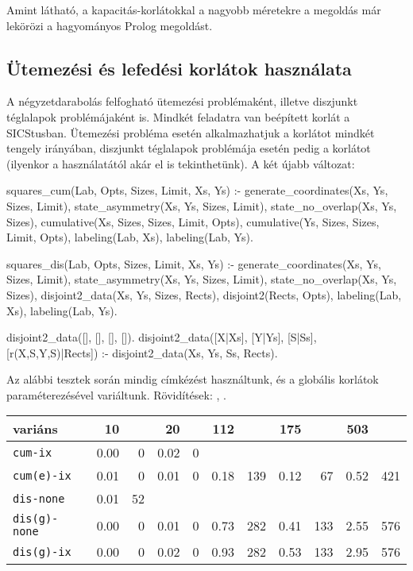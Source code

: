 Amint látható, a kapacitás-korlátokkal a nagyobb méretekre a \clpfd megoldás már
lekörözi a hagyományos Prolog megoldást.

\subsection{Ütemezési és lefedési korlátok használata}

A négyzetdarabolás felfogható ütemezési problémaként, illetve diszjunkt téglalapok
problémájaként is. Mindkét feladatra van beépített korlát a SICStusban. Ütemezési
probléma esetén alkalmazhatjuk a  korlátot mindkét tengely irányában,
diszjunkt téglalapok problémája esetén pedig a  korlátot (ilyenkor a
 használatától akár el is tekinthetünk).
\br
A két újabb változat:

\begin{prologcode}
squares_cum(Lab, Opts, Sizes, Limit, Xs, Ys) :-
        generate_coordinates(Xs, Ys, Sizes, Limit),
        state_asymmetry(Xs, Ys, Sizes, Limit),
        state_no_overlap(Xs, Ys, Sizes),
        cumulative(Xs, Sizes, Sizes, Limit, Opts),
        cumulative(Ys, Sizes, Sizes, Limit, Opts),
        labeling(Lab, Xs), labeling(Lab, Ys).

squares_dis(Lab, Opts, Sizes, Limit, Xs, Ys) :-
        generate_coordinates(Xs, Ys, Sizes, Limit),
        state_asymmetry(Xs, Ys, Sizes, Limit),
        state_no_overlap(Xs, Ys, Sizes),    %
        disjoint2_data(Xs, Ys, Sizes, Rects),
        disjoint2(Rects, Opts),
        labeling(Lab, Xs), labeling(Lab, Ys).

disjoint2_data([], [], [], []).
disjoint2_data([X|Xs], [Y|Ys], [S|Ss], [r(X,S,Y,S)|Rects]) :-
        disjoint2_data(Xs, Ys, Ss, Rects).
\end{prologcode}

Az alábbi tesztek során mindig \cd{[min]} címkézést használtunk, és a globális
korlátok paraméterezésével variáltunk. Rövidítések: ,
.

\begin{center}
\begin{tabular}{|l|rr|rr|rr|rr|rr|}
\hline
variáns   & 10     &      &  20   &      & 112    &      & 175   &    & 503  &\\
\hline
{\tt cum-ix}      &  0.00&    0&  0.02&    0&       &     &       &     &       &     \\
{\tt cum(e)-ix}   &  0.01&    0&  0.01&    0&  0.18&  139&  0.12&   67&  0.52&  421\\
\hline
{\tt dis-none}    &  0.01&   52&       &     &       &     &       &     &       &     \\
{\tt dis(g)-none} &  0.00&    0&  0.01&    0&  0.73&  282&  0.41&  133&  2.55&  576\\
{\tt dis(g)-ix}   &  0.00&    0&  0.02&    0&  0.93&  282&  0.53&  133&  2.95&  576\\
\hline
\end{tabular}
\end{center}

